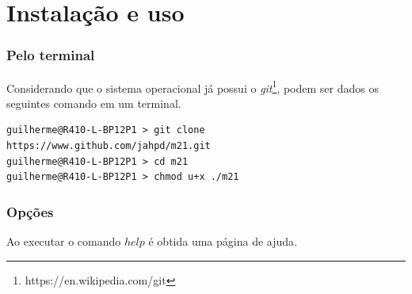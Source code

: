 \section{Instalação e uso}

\subsubsection*{Pelo terminal}

Considerando que o sistema operacional já possui o \emph{git}\footnote{https://en.wikipedia.com/git}, podem ser dados os seguintes comando em um terminal.

\begin{verbatim}
guilherme@R410-L-BP12P1 > git clone https://www.github.com/jahpd/m21.git
guilherme@R410-L-BP12P1 > cd m21
guilherme@R410-L-BP12P1 > chmod u+x ./m21
\end{verbatim}

\subsubsection*{Opções}

Ao executar o comando $help$ é obtida uma página de ajuda.

